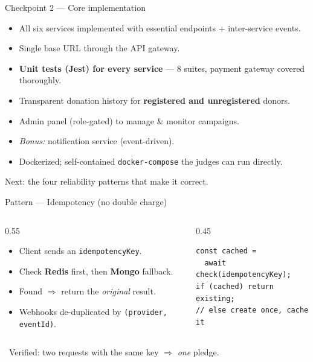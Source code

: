 \documentclass[aspectratio=169]{beamer}
\newcommand{\good}{\textcolor{brandgreen}{\textbf{\checkmark}}}
\begin{document}
\begin{frame}{Checkpoint 2 --- Core implementation}
  \begin{itemize}
    \item All six services implemented with essential endpoints + inter-service events.
    \item Single base URL through the API gateway.
    \item \textbf{Unit tests (Jest) for every service} --- 8 suites, payment gateway covered thoroughly.
    \item Transparent donation history for \textbf{registered and unregistered} donors.
    \item Admin panel (role-gated) to manage \& monitor campaigns.
    \item \emph{Bonus:} notification service (event-driven).
    \item Dockerized; self-contained \texttt{docker-compose} the judges can run directly.
  \end{itemize}
  \vfill
  \begin{center}\scriptsize Next: the four reliability patterns that make it correct.\end{center}
\end{frame}

\begin{frame}[fragile]{Pattern --- Idempotency (no double charge)}
  \begin{columns}[T]
    \begin{column}{0.55\textwidth}
      \begin{itemize}\small
        \item Client sends an \texttt{idempotencyKey}.
        \item Check \textbf{Redis} first, then \textbf{Mongo} fallback.
        \item Found $\Rightarrow$ return the \emph{original} result.
        \item Webhooks de-duplicated by \texttt{(provider, eventId)}.
      \end{itemize}
    \end{column}
    \begin{column}{0.45\textwidth}
      \begin{lstlisting}
const cached =
  await check(idempotencyKey);
if (cached) return existing;
// else create once, cache it
      \end{lstlisting}
    \end{column}
  \end{columns}
  \vspace{0.3em}
  \begin{center}\scriptsize\good\ Verified: two requests with the same key $\Rightarrow$ \emph{one} pledge.\end{center}
\end{frame}
\end{document}
